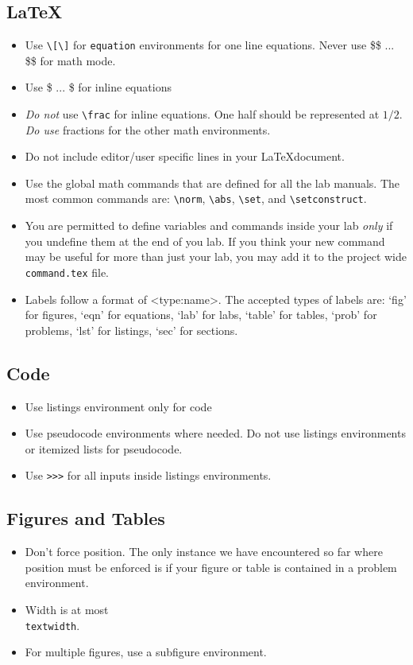 \subsection{\LaTeX}
\begin{itemize}
\item Use \texttt{\textbackslash{[}\textbackslash{]}} for \texttt{equation} environments for one line equations.  Never use \$\$ ... \$\$ for math mode.
\item Use \$ ... \$ for inline equations
\item \emph{Do not} use \texttt{\textbackslash{frac}} for inline equations.  One half should be represented at $1/2$. \emph{Do use} fractions for the other math environments.
\item Do not include editor/user specific lines in your \LaTeX document.
\item Use the global math commands that are defined for all the lab manuals.  The most common commands are: \texttt{\textbackslash{norm}}, \texttt{\textbackslash{abs}}, \texttt{\textbackslash{set}}, and \texttt{\textbackslash{setconstruct}}.
\item You are permitted to define variables and commands inside your lab \emph{only} if you undefine them at the end of you lab.  If you think your new command may be useful for more than just your lab, you may add it to the project wide \texttt{command.tex} file.
\item Labels follow a format of \textless type:name\textgreater.  The accepted types of labels are: `fig' for figures, `eqn' for equations, `lab' for labs, `table' for tables, `prob' for problems, `lst' for listings, `sec' for sections.
\end{itemize}


\subsection{Code}
\begin{itemize}
\item Use listings environment only for code
\item Use pseudocode environments where needed.  Do not use listings environments or itemized lists for pseudocode.
\item Use \texttt{>>>} for all inputs inside listings environments.
\end{itemize}

\subsection{Figures and Tables}
\begin{itemize}
\item Don't force position.  The only instance we have encountered so far where position must be enforced is if your figure or table is contained in a problem environment.
\item Width is at most \texttt{\\textwidth}.
\item For multiple figures, use a subfigure environment.
\end{itemize}


